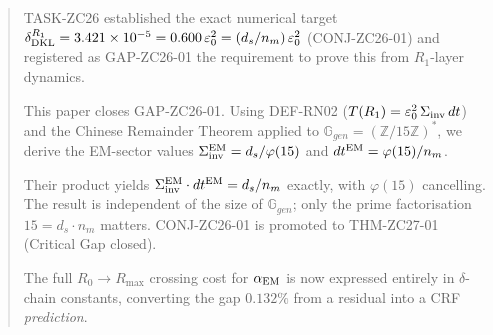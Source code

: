 \documentclass[12pt, a4paper]{article}
\begin{document}


\begin{abstract}
\sloppy
TASK-ZC26 established the exact numerical target
$\delta_{\rm DKL}^{R_1} = 3.421\times10^{-5}
= 0.600\,\varepsilon_0^2 = (d_s/n_m)\,\varepsilon_0^2$
(CONJ-ZC26-01) and registered as GAP-ZC26-01
the requirement to prove this from $R_1$-layer dynamics.

This paper closes GAP-ZC26-01.
Using DEF-RN02 ($T(R_1) = \varepsilon_0^2\,\Sigma_{\rm inv}\,dt$)
and the Chinese Remainder Theorem applied to
$\mathbb{G}_{gen} = (\mathbb{Z}/15\mathbb{Z})^*$,
we derive the EM-sector values
$\Sigma_{\rm inv}^{\rm EM} = d_s/\varphi(15)$
and $dt^{\rm EM} = \varphi(15)/n_m$.

Their product yields $\Sigma_{\rm inv}^{\rm EM}\cdot dt^{\rm EM}
= d_s/n_m$ exactly, with $\varphi(15)$ cancelling.
The result is independent of the size of $\mathbb{G}_{gen}$;
only the prime factorisation $15 = d_s \cdot n_m$ matters.
CONJ-ZC26-01 is promoted to THM-ZC27-01 (Critical Gap closed).

The full $R_0\to R_{\max}$ crossing cost for $\alpha_{\rm EM}$
is now expressed entirely in $\delta$-chain constants,
converting the gap $0.132\%$ from a residual into a
CRF \emph{prediction}.
\end{abstract}
\end{document}
